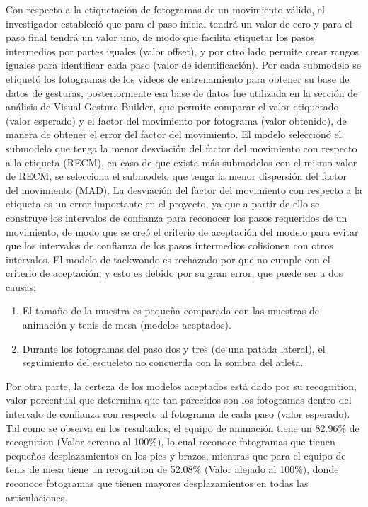\medbreak
Con respecto a la etiquetaci\'on de fotogramas de un movimiento v\'alido, el investigador estableci\'o que para el paso inicial tendr\'a un valor de cero y para el paso final tendr\'a un valor uno, de modo que facilita etiquetar los pasos intermedios por partes iguales (valor offset), y por otro lado permite crear rangos iguales para identificar cada paso (valor de identificaci\'on).
\medbreak
Por cada submodelo se etiquet\'o los fotogramas de los videos de entrenamiento para obtener su base de datos de gesturas, posteriormente esa base de datos fue utilizada en la secci\'on de an\'alisis de Visual Gesture Builder, que permite comparar el valor etiquetado (valor esperado) y el factor del movimiento por fotograma (valor obtenido), de manera de obtener el error del factor del movimiento.
\medbreak
El modelo seleccion\'o el submodelo que tenga la menor desviaci\'on del factor del movimiento con respecto a la etiqueta (RECM), en caso de que exista m\'as submodelos con el mismo valor de RECM, se selecciona el submodelo que tenga la menor dispersi\'on del factor del movimiento (MAD).
\medbreak
La desviaci\'on del factor del movimiento con respecto a la etiqueta es un error importante en el proyecto, ya que a partir de ello se construye los intervalos de confianza para reconocer los pasos requeridos de un movimiento, de modo que se cre\'o el criterio de aceptaci\'on del modelo para evitar que los intervalos de confianza de los pasos intermedios colisionen con otros intervalos.
\medbreak
El modelo de taekwondo es rechazado por que no cumple con el criterio de aceptaci\'on, y esto es debido por su gran error, que puede ser a dos causas:
\begin{enumerate}[1.]
\item El tama\~no de la muestra es peque\~na comparada con las muestras de animaci\'on y tenis de mesa (modelos aceptados).
\item Durante los fotogramas del paso dos y tres (de una patada lateral), el seguimiento del esqueleto no concuerda con la sombra del atleta.
\end{enumerate}
Por otra parte, la certeza de los modelos aceptados est\'a dado por su recognition, valor porcentual que determina que tan parecidos son los fotogramas dentro del intervalo de confianza con respecto al fotograma de cada paso (valor esperado). Tal como se observa en los resultados, el equipo de animaci\'on tiene un 82.96\% de recognition (Valor cercano al 100\%), lo cual reconoce fotogramas que tienen peque\~nos desplazamientos en los pies y brazos, mientras que para el equipo de tenis de mesa tiene un recognition de 52.08\%  (Valor alejado al 100\%), donde reconoce fotogramas que tienen mayores desplazamientos en todas las articulaciones.
